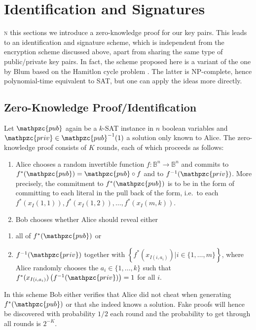 \documentclass[final,journal,compsoc]{IEEEtran}
\newcommand{\priv}{\mathpzc{priv}}
\newcommand{\pub}{\mathpzc{pub}}
\begin{document}
\section{Identification and Signatures\label{sec:ident-sign}}

\textsc{n} this sections we introduce a zero-knowledge proof for our key
pairs. This leads to an identification and signature scheme, which is
independent from the encryption scheme discussed above, apart from
sharing the same type of public/private key pairs. In fact, the scheme
proposed here is a variant of the one by Blum based on the Hamitlon
cycle problem \cite{Blum1986}. The latter is NP-complete, hence
polynomial-time equivalent to SAT, but one can apply the ideas more
directly.




\subsection{Zero-Knowledge Proof/Identification\label{sec:zero-knowl-proof}}

Let $\pub$ again be a $k$-SAT instance in $n$ boolean
variables and $\priv \in \pub^{-1}(1)$ a solution only known to
Alice. The zero-knowledge proof consists of
$K$ rounds, each of which proceeds as follows:
\begin{enumerate}
\item Alice chooses a random invertible function $f : \mathbb B^n \to
  \mathbb B^n$ and commits to $f^*(\pub) = \pub \circ f$ and to
  $f^{-1}(\priv)$. More precisely, the commitment to $f^*(\pub)$ is to
  be in the form of committing to each literal in the pull back of the
  form, i.e.\ to each $f^*(x_I(1,1)), f^*(x_I(1,2)), \ldots,
    f^*(x_I(m,k))$.

\item \label{item:14} Bob chooses whether Alice should reveal either
\end{enumerate}
\begin{enumerate}[label=2.\alph*)]
\item\label{item:15} all of $f^*(\pub)$ or
\item\label{item:16} $f^{-1}(\priv)$ together with $\left\{f^*(x_{I(i,a_i)}) | i \in
    \{1,\ldots,m\}\right\}$, where Alice randomly chooses the $a_i \in
  \{1,\ldots,k\}$ such that
  $f^*(x_{I(i,a_i)})\left(f^{-1}(\priv)\right)=1$ for all $i$. 
\end{enumerate}
In this scheme Bob either verifies that Alice did not cheat when
generating $f^*(\pub)$ or that she indeed knows a solution. Fake
proofs will hence be discovered with probability $1/2$ each
round and the probability to get through all rounds is 
$2^{-K}$.
\end{document}
